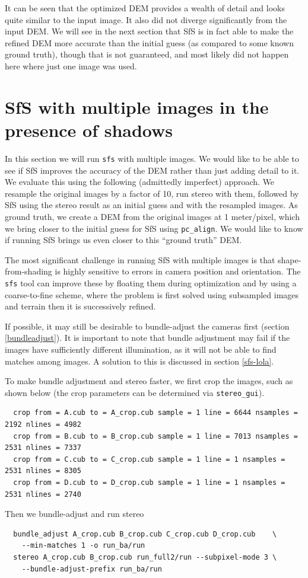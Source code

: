 It can be seen that the optimized DEM provides a wealth of detail and
looks quite similar to the input image. It also did not diverge
significantly from the input DEM. We will see in the next section that
SfS is in fact able to make the refined DEM more accurate than the
initial guess (as compared to some known ground truth), though that is
not guaranteed, and most likely did not happen here where just one image
was used.

\section{SfS with multiple images in the presence of shadows}

In this section we will run \texttt{sfs} with multiple images. We would
like to be able to see if SfS improves the accuracy of the DEM rather
than just adding detail to it. We evaluate this using the following
(admittedly imperfect) approach. We resample the original images by a
factor of 10, run stereo with them, followed by SfS using the stereo
result as an initial guess and with the resampled images. As ground
truth, we create a DEM from the original images at 1 meter/pixel, which
we bring closer to the initial guess for SfS using
\texttt{pc\_align}. We would like to know if running SfS brings us even
closer to this ``ground truth'' DEM.

The most significant challenge in running SfS with multiple images is
that shape-from-shading is highly sensitive to errors in camera position
and orientation. The \texttt{sfs} tool can improve these by floating
them during optimization and by using a coarse-to-fine scheme, where
the problem is first solved using subsampled images and terrain then
it is successively refined.

If possible, it may still be desirable to bundle-adjust the cameras first
(section \ref{bundleadjust}). It is important to note that bundle adjustment may
fail if the images have sufficiently different illumination, as it will
not be able to find matches among images. A solution to this is discussed
in section \ref{sfs-lola}.

To make bundle adjustment and stereo faster, we first crop the images,
such as shown below (the crop parameters can be determined via
\texttt{stereo\_gui}).
\begin{verbatim}
  crop from = A.cub to = A_crop.cub sample = 1 line = 6644 nsamples = 2192 nlines = 4982
  crop from = B.cub to = B_crop.cub sample = 1 line = 7013 nsamples = 2531 nlines = 7337
  crop from = C.cub to = C_crop.cub sample = 1 line = 1 nsamples = 2531 nlines = 8305
  crop from = D.cub to = D_crop.cub sample = 1 line = 1 nsamples = 2531 nlines = 2740
\end{verbatim}
Then we bundle-adjust and run stereo
\begin{verbatim}
  bundle_adjust A_crop.cub B_crop.cub C_crop.cub D_crop.cub    \
    --min-matches 1 -o run_ba/run
  stereo A_crop.cub B_crop.cub run_full2/run --subpixel-mode 3 \
    --bundle-adjust-prefix run_ba/run
\end{verbatim}

